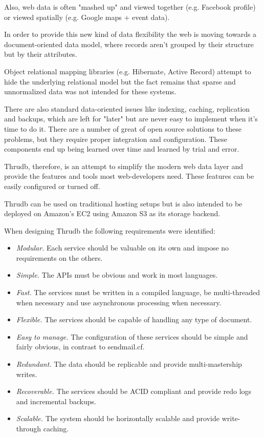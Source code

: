 \documentclass[nocopyrightspace,blockstyle]{sigplanconf}
\begin{document}
Also, web data is often "mashed up" and viewed together (e.g. Facebook profile) or viewed spatially (e.g. Google maps + event data).

In order to provide this new kind of data flexibility the web is moving towards a document-oriented data model, where records aren't grouped by their structure but by their attributes.

Object relational mapping libraries (e.g. Hibernate, Active Record) attempt to hide the underlying relational model but the fact remains that sparse and unnormalized data was not intended for these systems.

There are also standard data-oriented issues like indexing, caching, replication and backups, which are left for "later" but are never easy to implement when it's time to do it.
There are a number of great of open source solutions to these problems, but they require proper integration and configuration.  These components end up being learned over time and learned by trial and error.

Thrudb, therefore, is an attempt to simplify the modern web data layer and provide the features and tools most web-developers need.  These features can be easily configured or turned off.

Thrudb can be used on traditional hosting setups but is also intended to be deployed on Amazon's EC2 using Amazon S3 as its storage backend.

When designing Thrudb the following requirements were identified:

\begin{itemize}

\item\textit{Modular.} Each service should be valuable on its own and impose no requirements on the others.

\item\textit{Simple.} The APIs must be obvious and work in most languages.

\item\textit{Fast.} The services must be written in a compiled language, be multi-threaded when necessary and use asynchronous processing when necessary.

\item\textit{Flexible.} The services should be capable of handling any type of document.

\item\textit{Easy to manage.} The configuration of these services should be simple and fairly obvious, in contrast to sendmail.cf.

\item\textit{Redundant.} The data should be replicable and provide multi-mastership writes.

\item\textit{Recoverable.} The services should be ACID compliant and provide redo logs and incremental backups.

\item\textit{Scalable.} The system should be horizontally scalable and provide write-through caching.
\end{itemize}
\end{document}
